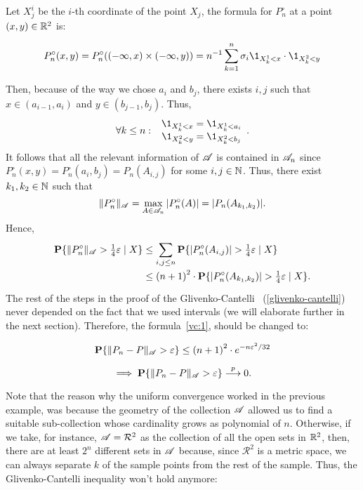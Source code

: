 \vspace*{1em}

Let $X^i_j$ be the $i$-th coordinate of the point $X_j$, the formula for $P_n^\circ$ at a point $(x,y) \in \R^2$ is:

\[ P_n^\circ(x,y) = P_n^\circ((-\infty, x)\times(-\infty, y)) = n^{-1} \sum_{k = 1}^{n} \sigma_i \1_{X_k^1 < x}\cdot \1_{X_k^2 < y} \] 

Then, because of the way we chose $a_i$ and $b_j$, there exists $i, j$ such that $x \in (a_{i-1}, a_i)$ and $y \in (b_{j-1}, b_j)$. Thus,
\[ \forall k \leq n:\; \begin{array}{c}
    \1_{X_k^1 < x} = \1_{X_k^1 < a_i}\\
    \1_{X_k^2 < y} = \1_{X_k^2 < b_j}
\end{array} .\] 
It follows that all the relevant information of $\AA$ is contained in $\AA_n$ since $P_n^\circ(x,y) = P_n^\circ(a_{i},b_{j}) = P_n(A_{i,j})$ for some $i,j \in\N$. Thus, there exist $k_1, k_2\in \N$ such that
\[ \|P_n^\circ\|_\AA = \max_{A \in \AA_n}|P_n^\circ(A)| =  |P_n(A_{k_1,k_2})|. \]
Hence, 
\begin{equation} \label{vc:2}
    \everymath{\displaystyle}\arraycolsep=1.4pt\def\arraystretch{1.5}
    \begin{array}{rcl}
    \P\{ \|P_n^\circ\|_\AA > \tfrac{1}{4} \varepsilon \;|\; X \} & \leq & \sum_{i,j \leq n}\P\{ |P_n^\circ(A_{i,j})| > \tfrac{1}{4} \varepsilon \;|\; X \}\\
    & \leq & {(n+1)}^2 \cdot \P\{ |P_n^\circ(A_{k_1,k_2})| > \tfrac{1}{4} \varepsilon \;|\; X \} .
  \end{array}
\end{equation}
The rest of the steps in the proof of the Glivenko-Cantelli ~(\ref{glivenko-cantelli}) never depended on the fact that we used intervals (we will elaborate further in the next section). Therefore, the formula~\ref{vc:1}, should be changed to:

\begin{equation}
    \label{vc:3}
    \P\{\|P_n-P\|_{\AA} > \varepsilon\} \leq {(n+1)}^2 \cdot e^{-n \varepsilon^2 / 32}
\end{equation}

\[ \implies \P\{\|P_n-P\|_\AA > \varepsilon\} \overset{p}{\longrightarrow} 0.  \] 

Note that the reason why the uniform convergence worked in the previous example, was because the geometry of the collection $\AA$ allowed us to find a suitable sub-collection whose cardinality grows as polynomial of $n$. Otherwise, if we take, for instance, $\AA = \mathcal{R}^2$ as the collection of all the open sets in $\R^2$, then, there are at least $2^{n}$ different sets in $\AA$ because, since $\mathcal{R}^2$ is a metric space, we can always separate $k$ of the sample points from the rest of the sample. Thus, the Glivenko-Cantelli inequality won't hold anymore:

